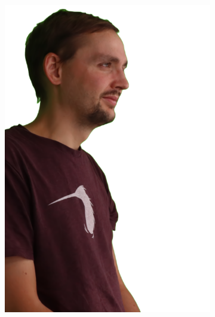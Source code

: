 \begin{figure}[!ht]
\begin{subfigure}{0.12\linewidth}
        \includegraphics[width=\textwidth]{Figures/results/initials/simon/20_render.png}
	\end{subfigure}
    \begin{subfigure}{0.12\linewidth}

\end{subfigure}
\end{figure}

